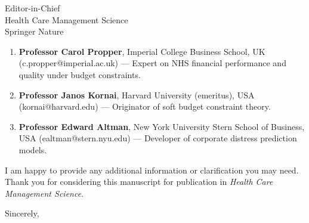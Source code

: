 \documentclass[11pt]{letter}
\begin{document}
\begin{letter}{
Editor-in-Chief \\
Health Care Management Science \\
Springer Nature
}
\begin{enumerate}
    \item \textbf{Professor Carol Propper}, Imperial College Business School, UK (c.propper@imperial.ac.uk) --- Expert on NHS financial performance and quality under budget constraints.

    \item \textbf{Professor Janos Kornai}, Harvard University (emeritus), USA (kornai@harvard.edu) --- Originator of soft budget constraint theory.

    \item \textbf{Professor Edward Altman}, New York University Stern School of Business, USA (ealtman@stern.nyu.edu) --- Developer of corporate distress prediction models.
\end{enumerate}

I am happy to provide any additional information or clarification you may need. Thank you for considering this manuscript for publication in \textit{Health Care Management Science}.

\closing{Sincerely,}

\end{letter}
\end{document}
